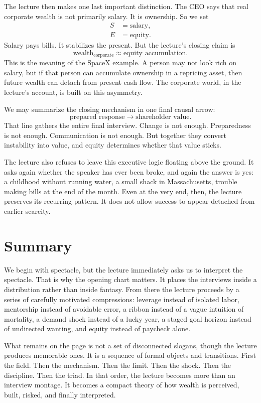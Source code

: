 The lecture then makes one last important distinction. The CEO says that real corporate wealth is not primarily salary. It is ownership. So we set
\begin{align}
S &= \text{salary},\\
E &= \text{equity}.
\end{align}
Salary pays bills. It stabilizes the present. But the lecture's closing claim is
\begin{equation}
\text{wealth}_{\text{corporate}} \approx \text{equity accumulation}.
\end{equation}
This is the meaning of the SpaceX example. A person may not look rich on salary, but if that person can accumulate ownership in a repricing asset, then future wealth can detach from present cash flow. The corporate world, in the lecture's account, is built on this asymmetry.

We may summarize the closing mechanism in one final causal arrow:
\begin{equation}
\text{prepared response} \rightarrow \text{shareholder value}.
\end{equation}
That line gathers the entire final interview. Change is not enough. Preparedness is not enough. Communication is not enough. But together they convert instability into value, and equity determines whether that value sticks.

The lecture also refuses to leave this executive logic floating above the ground. It asks again whether the speaker has ever been broke, and again the answer is yes: a childhood without running water, a small shack in Massachusetts, trouble making bills at the end of the month. Even at the very end, then, the lecture preserves its recurring pattern. It does not allow success to appear detached from earlier scarcity.

\section{Summary}

We begin with spectacle, but the lecture immediately asks us to interpret the spectacle. That is why the opening chart matters. It places the interviews inside a distribution rather than inside fantasy. From there the lecture proceeds by a series of carefully motivated compressions: leverage instead of isolated labor, mentorship instead of avoidable error, a ribbon instead of a vague intuition of mortality, a demand shock instead of a lucky year, a staged goal horizon instead of undirected wanting, and equity instead of paycheck alone.

What remains on the page is not a set of disconnected slogans, though the lecture produces memorable ones. It is a sequence of formal objects and transitions. First the field. Then the mechanism. Then the limit. Then the shock. Then the discipline. Then the triad. In that order, the lecture becomes more than an interview montage. It becomes a compact theory of how wealth is perceived, built, risked, and finally interpreted.